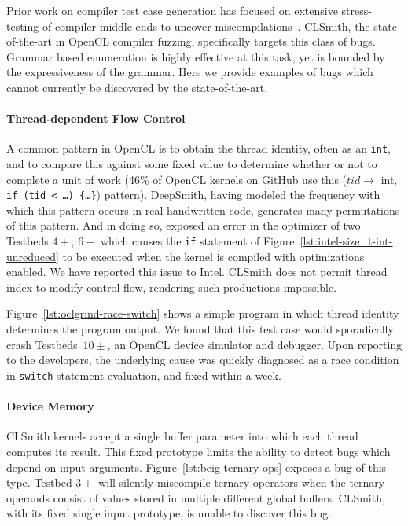 Prior work on compiler test case generation has focused on extensive stress-testing of compiler middle-ends to uncover miscompilations~\cite{Chen2014a}. CLSmith, the state-of-the-art in OpenCL compiler fuzzing, specifically targets this class of bugs. Grammar based enumeration is highly effective at this task, yet is bounded by the expressiveness of the grammar. Here we provide examples of bugs which cannot currently be discovered by the state-of-the-art.

%
\paragraph{Thread-dependent Flow Control} A common pattern in OpenCL is to obtain the thread identity, often as an \texttt{int}, and to compare this against some fixed value to determine whether or not to complete a unit of work (46\% of OpenCL kernels on GitHub use this ($tid \rightarrow$ int, \texttt{if (tid < \ldots) \{\ldots\}}) pattern). DeepSmith, having modeled the frequency with which this pattern occurs in real handwritten code, generates many permutations of this pattern. And in doing so, exposed an error in the optimizer of two Testbeds $4+$, $6+$ which causes the \texttt{if} statement of Figure~\ref{lst:intel-size_t-int-unreduced} to be executed when the kernel is compiled with optimizations enabled. We have reported this issue to Intel. CLSmith does not permit thread index to modify control flow, rendering such productions impossible.

Figure~\ref{lst:oclgrind-race-switch} shows a simple program in which thread identity determines the program output. We found that this test case would sporadically crash Testbeds~$10\pm$, an OpenCL device simulator and debugger. Upon reporting to the developers, the underlying cause was quickly diagnosed as a race condition in \texttt{switch} statement evaluation, and fixed within a week.

\paragraph{Device Memory} CLSmith kernels accept a single buffer parameter into which each thread computes its result. This fixed prototype limits the ability to detect bugs which depend on input arguments. Figure~\ref{lst:beig-ternary-ops} exposes a bug of this type. Testbed $3\pm$ will silently miscompile ternary operators when the ternary operands consist of values stored in multiple different global buffers. CLSmith, with its fixed single input prototype, is unable to discover this bug. %

